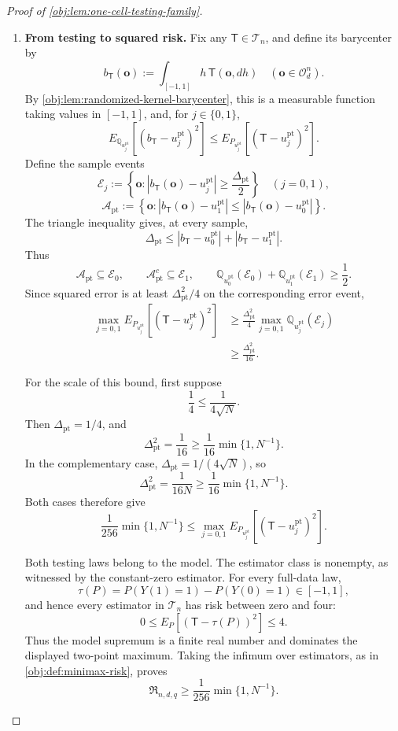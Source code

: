 \begin{proof}[Proof of \cref{obj:lem:one-cell-testing-family}]
\begin{enumerate}
\item \textbf{From testing to squared risk.}
Fix any \(\mathsf T\in\mathcal T_n\), and define its barycenter by
\[
b_{\mathsf T}(\boldsymbol o)
:=
\int_{[-1,1]}h\,\mathsf T(\boldsymbol o,dh)
\quad(\boldsymbol o\in\mathcal O_d^n).
\]
By \cref{obj:lem:randomized-kernel-barycenter}, this is a measurable function taking values in \([-1,1]\), and, for \(j\in\{0,1\}\),
\[
E_{\mathbb Q_{u_j^{\mathrm{pt}}}}
 \left[(b_{\mathsf T}-u_j^{\mathrm{pt}})^2\right]
\le
E_{P_{u_j^{\mathrm{pt}}}}
 \left[(\mathsf T-u_j^{\mathrm{pt}})^2\right].
\]
Define the sample events
\[
\mathscr E_j:=
\left\{\boldsymbol o:
 |b_{\mathsf T}(\boldsymbol o)-u_j^{\mathrm{pt}}|
 \ge\frac{\Delta_{\mathrm{pt}}}{2}\right\}
\quad(j=0,1),
\]
\[
\mathscr A_{\mathrm{pt}}:=
\left\{\boldsymbol o:
 |b_{\mathsf T}(\boldsymbol o)-u_1^{\mathrm{pt}}|
 \le
 |b_{\mathsf T}(\boldsymbol o)-u_0^{\mathrm{pt}}|\right\}.
\]
The triangle inequality gives, at every sample,
\[
\Delta_{\mathrm{pt}}
\le
|b_{\mathsf T}-u_0^{\mathrm{pt}}|
+
|b_{\mathsf T}-u_1^{\mathrm{pt}}|.
\]
Thus
\[
\mathscr A_{\mathrm{pt}}\subseteq\mathscr E_0,
\qquad
\mathscr A_{\mathrm{pt}}^c\subseteq\mathscr E_1,
\qquad
\mathbb Q_{u_0^{\mathrm{pt}}}(\mathscr E_0)
+\mathbb Q_{u_1^{\mathrm{pt}}}(\mathscr E_1)
\ge\frac12.
\]
Since squared error is at least \(\Delta_{\mathrm{pt}}^2/4\) on the corresponding error event,
\[
\begin{aligned}
\max_{j=0,1}
E_{P_{u_j^{\mathrm{pt}}}}
 \left[(\mathsf T-u_j^{\mathrm{pt}})^2\right]
&\ge
\frac{\Delta_{\mathrm{pt}}^2}{4}
\max_{j=0,1}
\mathbb Q_{u_j^{\mathrm{pt}}}(\mathscr E_j)\\
&\ge\frac{\Delta_{\mathrm{pt}}^2}{16}.
\end{aligned}
\]

For the scale of this bound, first suppose
\[
\frac14\le\frac1{4\sqrt N}.
\]
Then \(\Delta_{\mathrm{pt}}=1/4\), and
\[
\Delta_{\mathrm{pt}}^2=\frac1{16}
\ge\frac1{16}\min\{1,N^{-1}\}.
\]
In the complementary case,
\(\Delta_{\mathrm{pt}}=1/(4\sqrt N)\), so
\[
\Delta_{\mathrm{pt}}^2=\frac1{16N}
\ge\frac1{16}\min\{1,N^{-1}\}.
\]
Both cases therefore give
\[
\frac1{256}\min\{1,N^{-1}\}
\le
\max_{j=0,1}
E_{P_{u_j^{\mathrm{pt}}}}
 \left[(\mathsf T-u_j^{\mathrm{pt}})^2\right].
\]

Both testing laws belong to the model. The estimator class is nonempty, as witnessed by the constant-zero estimator. For every full-data law,
\[
\tau(P)=P(Y(1)=1)-P(Y(0)=1)\in[-1,1],
\]
and hence every estimator in \(\mathcal T_n\) has risk between zero and four:
\[
0\le E_P[(\mathsf T-\tau(P))^2]\le4.
\]
Thus the model supremum is a finite real number and dominates the displayed two-point maximum. Taking the infimum over estimators, as in
\cref{obj:def:minimax-risk}, proves
\[
\mathfrak R_{n,d,q}
\ge\frac1{256}\min\{1,N^{-1}\}.
\]


\end{enumerate}
\end{proof}
